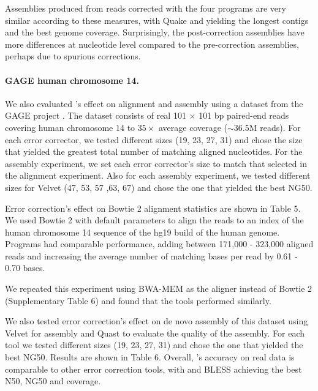 \documentclass{bmcart}
\begin{document}
Assemblies produced from reads corrected with the four programs are very similar according to these measures, with Quake and \tool yielding the longest contigs and the best genome coverage. Surprisingly, the post-correction assemblies have more differences at nucleotide level compared to the pre-correction assemblies, perhaps due to spurious corrections.

\paragraph{GAGE human chromosome 14.}
We also evaluated \tool's effect on alignment and assembly using a dataset from the GAGE project \cite{salzberg2012gage}.  The dataset consists of real 101 $\times$ 101 bp paired-end reads covering human chromosome 14 to $35\times$ average coverage ($\sim$36.5M reads).  For each error corrector, we tested different \kmer sizes (19, 23, 27, 31) and chose the size that yielded the greatest total number of matching aligned nucleotides.  For the assembly experiment, we set each error corrector's \kmer size to match that selected in the alignment experiment.  Also for each assembly experiment, we tested different \kmer sizes for Velvet (47, 53, 57 ,63, 67) and chose the one that yielded the best NG50.

Error correction's effect on Bowtie 2 alignment statistics are shown in Table 5.  We used Bowtie 2 with default parameters to align the reads to an index of the human chromosome 14 sequence of the hg19 build of the human genome.  Programs had comparable performance, adding between 171,000 - 323,000 aligned reads and increasing the average number of matching bases per read by 0.61 - 0.70 bases.

We repeated this experiment using BWA-MEM as the aligner instead of Bowtie 2 (Supplementary Table 6) and found that the tools performed similarly.

We also tested error correction's effect on de novo assembly of this dataset using Velvet for assembly and Quast to evaluate the quality of the assembly.  For each tool we tested different \kmer sizes (19, 23, 27, 31) and chose the one that yielded the best NG50.  Results are shown in Table 6.  Overall, \tool's accuracy on real data is comparable to other error correction tools, with \tool and BLESS achieving the best N50, NG50 and coverage.
\end{document}
